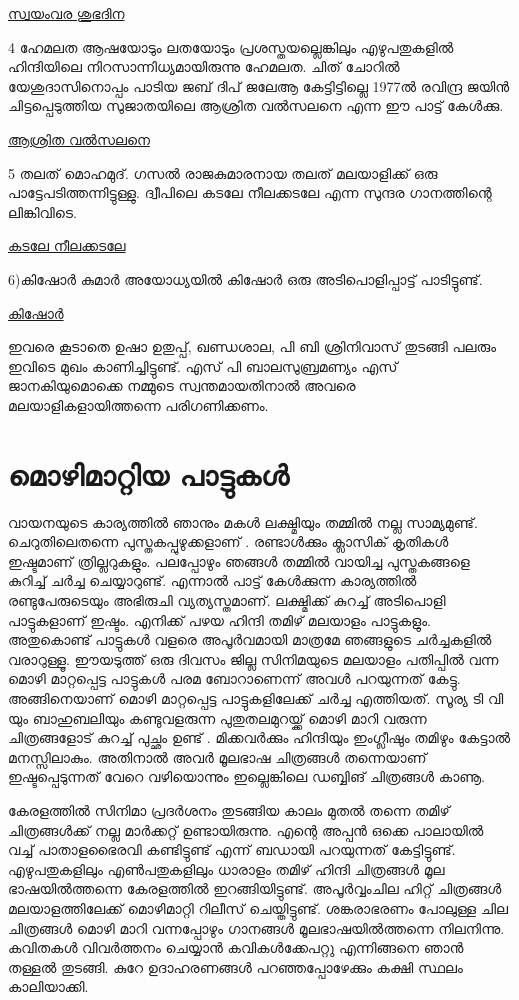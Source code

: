\documentclass[10pt,a4paper]{report}
\begin{document}
\href{https://youtu.be/3-jat5BG9MY}{സ്വയംവര ശുഭദിന}

4 ഹേമലത
ആഷയോടും ലതയോടും പ്രശസ്തയല്ലെങ്കിലും എഴുപതുകളിൽ ഹിന്ദിയിലെ നിറസാന്നിധ്യമായിരുന്നു ഹേമലത. ചിത് ചോറിൽ യേശുദാസിനൊപ്പം പാടിയ ജബ് ദിപ് ജലേആ കേട്ടിട്ടില്ലെ 1977ൽ രവിന്ദ്ര ജയിൻ ചിട്ടപ്പെടുത്തിയ സുജാതയിലെ ആശ്രിത വൽസലനെ എന്ന ഈ പാട്ട് കേൾക്കു.

\href{https://youtu.be/-p0tOi0uY-s}{ആശ്രിത വൽസലനെ}

5 തലത് മൊഹമുദ്.
ഗസൽ രാജകുമാരനായ തലത് മലയാളിക്ക് ഒരു പാട്ടേപടിത്തന്നിട്ടുള്ളു. ദ്വീപിലെ കടലേ നീലക്കടലേ എന്ന സുന്ദര ഗാനത്തിന്റെ ലിങ്കിവിടെ.

\href{https://youtu.be/iNKuno36Jtg}{കടലേ നീലക്കടലേ}

6)കിഷോർ കുമാർ
അയോധ്യയിൽ കിഷോർ ഒരു അടിപൊളിപ്പാട്ട് പാടിട്ടുണ്ട്.

\href{https://youtu.be/SUB3Q_i0px4}{കിഷോർ}

ഇവരെ കൂടാതെ ഉഷാ ഉതുപ്പ്, ഖണ്ഡശാല, പി ബി ശ്രിനിവാസ് തുടങ്ങി പലരും ഇവിടെ മുഖം കാണിച്ചിട്ടുണ്ട്. എസ് പി ബാലസുബ്രമണ്യം എസ് ജാനകിയുമൊക്കെ നമ്മുടെ സ്വന്തമായതിനാൽ അവരെ മലയാളികളായിത്തന്നെ പരിഗണിക്കണം.

\section{ മൊഴിമാറ്റിയ പാട്ടുകൾ}


വായനയുടെ കാര്യത്തിൽ ഞാനും മകൾ ലക്ഷ്മിയും തമ്മിൽ നല്ല സാമ്യമുണ്ട്. ചെറുതിലെതന്നെ പുസ്തകപ്പുഴുക്കളാണ് . രണ്ടാൾക്കും ക്ലാസിക് കൃതികൾ ഇഷ്ടമാണ് ത്രില്ലറുകളും. പലപ്പോഴും ഞങ്ങൾ തമ്മിൽ വായിച്ച പുസ്തകങ്ങളെ കുറിച്ച് ചർച്ച ചെയ്യാറുണ്ട്. എന്നാൽ പാട്ട് കേൾക്കുന്ന കാര്യത്തിൽ രണ്ടുപേരുടെയും അഭിരുചി വ്യത്യസ്തമാണ്. ലക്ഷ്മിക്ക് കുറച്ച് അടിപൊളി പാട്ടുകളാണ് ഇഷ്ടം. എനിക്ക് പഴയ ഹിന്ദി തമിഴ് മലയാളം പാട്ടുകളും. അതുകൊണ്ട് പാട്ടുകൾ വളരെ അപൂർവമായി മാത്രമേ ഞങ്ങളുടെ ചർച്ചകളിൽ വരാറുള്ളൂ. ഈയടുത്ത് ഒരു ദിവസം ജില്ല സിനിമയുടെ മലയാളം പതിപ്പിൽ വന്ന മൊഴി മാറ്റപ്പെട്ട പാട്ടുകൾ പരമ ബോറാണെന്ന് അവൾ പറയുന്നത് കേട്ടു. അങ്ങിനെയാണ് മൊഴി മാറ്റപ്പെട്ട പാട്ടുകളിലേക്ക് ചർച്ച എത്തിയത്. സൂര്യ ടി വി യും ബാഹുബലിയും കണ്ടുവളരുന്ന പുതുതലമുറയ്ക്ക് മൊഴി മാറി വരുന്ന ചിത്രങ്ങളോട് കുറച്ച് പുച്ഛം ഉണ്ട് . മിക്കവർക്കും ഹിന്ദിയും ഇംഗ്ലീഷും തമിഴും കേട്ടാൽ മനസ്സിലാകും. അതിനാൽ അവർ മൂലഭാഷ ചിത്രങ്ങൾ തന്നെയാണ് ഇഷ്ടപ്പെടുന്നത് വേറെ വഴിയൊന്നും ഇല്ലെങ്കിലെ  ഡബ്ബിങ് ചിത്രങ്ങൾ കാണൂ.

കേരളത്തിൽ സിനിമാ പ്രദർശനം തുടങ്ങിയ കാലം മുതൽ തന്നെ തമിഴ് ചിത്രങ്ങൾക്ക് നല്ല മാർക്കറ്റ് ഉണ്ടായിരുന്നു. എന്റെ അപ്പൻ ഒക്കെ പാലായിൽ വച്ച് പാതാളഭൈരവി കണ്ടിട്ടുണ്ട് എന്ന് ബഡായി പറയുന്നത് കേട്ടിട്ടുണ്ട്. എഴുപതുകളിലും എൺപതുകളിലും ധാരാളം തമിഴ് ഹിന്ദി ചിത്രങ്ങൾ മൂല ഭാഷയിൽത്തന്നെ കേരളത്തിൽ ഇറങ്ങിയിട്ടുണ്ട്. അപൂർവ്വംചില ഹിറ്റ് ചിത്രങ്ങൾ മലയാളത്തിലേക്ക് മൊഴിമാറ്റി റിലീസ് ചെയ്തിട്ടുണ്ട്. ശങ്കരാഭരണം പോലുള്ള ചില ചിത്രങ്ങൾ മൊഴി മാറി വന്നപ്പോഴും ഗാനങ്ങൾ മൂലഭാഷയിൽത്തന്നെ നിലനിന്നു. കവിതകൾ വിവർത്തനം ചെയ്യാൻ കവികൾക്കേപറ്റു എന്നിങ്ങനെ ഞാൻ തള്ളൽ തുടങ്ങി. കുറേ ഉദാഹരണങ്ങൾ പറഞ്ഞപ്പോഴേക്കും കക്ഷി സ്ഥലം കാലിയാക്കി.
\end{document}
